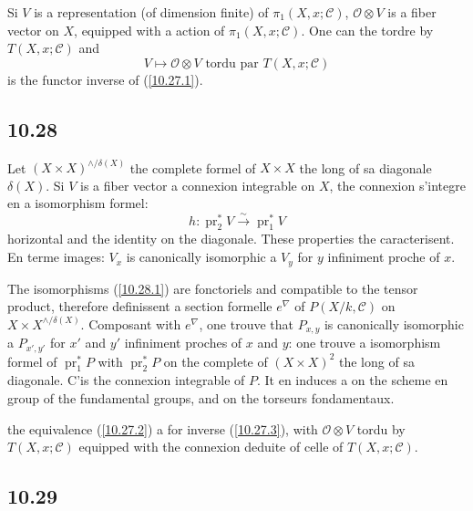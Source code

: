 \documentclass[12pt,a4paper]{article}
\theoremstyle{plain}
\theoremstyle{definition}
\theoremstyle{remark}
\DeclareMathOperator{\pr}{pr}
\begin{document}
Si $V$ is a representation (of dimension finite) of $\pi_1(X, x; \mathcal{C})$, $\mathcal{O} \otimes V$ is a fiber vector on $X$, equipped with a action of $\pi_1(X, x; \mathcal{C})$. One can the tordre by $T(X, x; \mathcal{C})$ and
\begin{equation}\label{10.27.3}
V \longmapsto \mathcal{O} \otimes V \text{ tordu par } T(X, x; \mathcal{C}) \tag{10.27.3}
\end{equation}
is the functor inverse of (\ref{10.27.1}).

\subsection*{10.28}

Let $(X \times X)^{\wedge/\delta(X)}$ the complete formel of $X \times X$ the long of sa diagonale $\delta(X)$. Si $V$ is a fiber vector a connexion integrable on $X$, the connexion s'integre en a isomorphism formel:
\begin{equation}\label{10.28.1}
h: \pr_2^* V \xrightarrow{\sim} \pr_1^* V \tag{10.28.1}
\end{equation}
horizontal and the identity on the diagonale. These properties the caracterisent. En terme images: $V_x$ is canonically isomorphic a $V_y$ for $y$ infiniment proche of $x$.

The isomorphisms (\ref{10.28.1}) are fonctoriels and compatible to the tensor product, therefore definissent a section formelle $e^\nabla$ of $P(X/k, \mathcal{C})$ on $X \times X^{\wedge/\delta(X)}$. Composant with $e^\nabla$, one trouve that $P_{x,y}$ is canonically isomorphic a $P_{x',y'}$ for $x'$ and $y'$ infiniment proches of $x$ and $y$: one trouve a isomorphism formel of $\pr_1^* P$ with $\pr_2^* P$ on the complete of $(X \times X)^2$ the long of sa diagonale. C'is the connexion integrable of $P$. It en induces a on the scheme en group of the fundamental groups, and on the torseurs fondamentaux.

the equivalence (\ref{10.27.2}) a for inverse (\ref{10.27.3}), with $\mathcal{O} \otimes V$ tordu by $T(X, x; \mathcal{C})$ equipped with the connexion deduite of celle of $T(X, x; \mathcal{C})$.

\subsection*{10.29}
\end{document}

